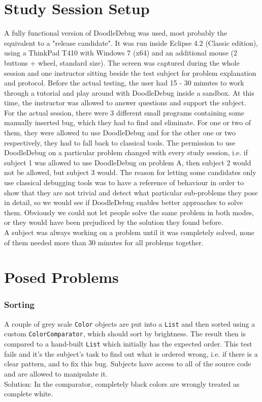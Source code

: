 \documentclass[a4paper,ngerman,english]{amsbook} %
\begin{document}
\section*{Study Session Setup}
A fully functional version of DoodleDebug was used, most probably the equivalent to a "release candidate". It was run inside Eclipse 4.2 (Classic edition), using a ThinkPad T410 with Windows 7 (x64) and an additional mouse (2 buttons + wheel, standard size). The screen was captured during the whole session and one instructor sitting beside the test subject for problem explanation and protocol. Before the actual testing, the user had 15 - 30 minutes to work through a tutorial and play around with DoodleDebug inside a sandbox. At this time, the instructor was allowed to answer questions and support the subject.\\
For the actual session, there were 3 different small programs containing some manually inserted bug, which they had to find and eliminate. For one or two of them, they were allowed to use DoodleDebug and for the other one or two respectively, they had to fall back to classical tools. The permission to use DoodleDebug on a particular problem changed with every study session, i.e. if subject 1 was allowed to use DoodleDebug on problem A, then subject 2 would not be allowed, but subject 3 would. The reason for letting some candidates only use classical debugging tools was to have a reference of behaviour in order to show that they are not trivial and detect what particular sub-problems they pose in detail, so we would see if DoodleDebug enables better approaches to solve them. Obviously we could not let people solve the same problem in both modes, or they would have been prejudiced by the solution they found before.\\
A subject was always working on a problem until it was completely solved, none of them needed more than 30 minutes for all problems together.

\section*{Posed Problems}
\subsubsection*{Sorting}
A couple of grey scale \verb.Color. objects are put into a \verb.List. and then sorted using a custom \verb.ColorComparator., which should sort by brightness. The result then is compared to a hand-built \verb.List. which initially has the expected order. This test fails and it's the subject's task to find out what is ordered wrong, i.e. if there is a clear pattern, and to fix this bug. Subjects have access to all of the source code and are allowed to manipulate it.\\
Solution: In the comparator, completely black colors are wrongly treated as complete white.
\end{document}

